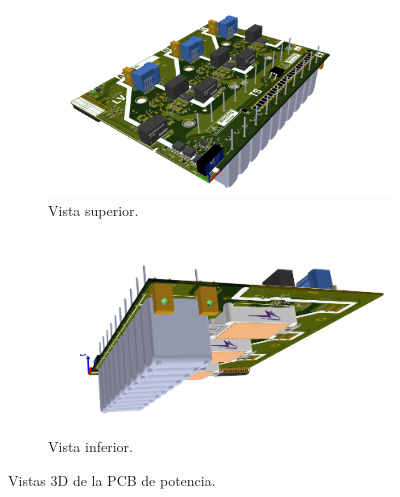 \begin{figure}[H]
	\centering
	\begin{subfigure}{0.45\linewidth}
		\centering
		\includegraphics[width=\linewidth]{fig/invPower1}
		\caption{Vista superior.}
	\end{subfigure}
	\hspace{0.05\linewidth} %
	\begin{subfigure}{0.45\linewidth}
		\centering
		\includegraphics[width=\linewidth]{fig/invPower2}
		\caption{Vista inferior.}
	\end{subfigure}
	\caption{Vistas 3D de la PCB de potencia.}

\end{figure}


